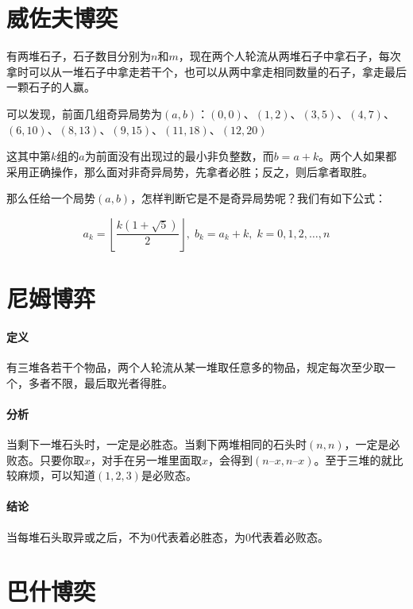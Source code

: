 \section{威佐夫博奕}

有两堆石子，石子数目分别为$n$和$m$，现在两个人轮流从两堆石子中拿石子，每次拿时可以从一堆石子中拿走若干个，也可以从两中拿走相同数量的石子，拿走最后一颗石子的人赢。

可以发现，前面几组奇异局势为$(a, b)$：$(0, 0)$、$(1, 2)$、$(3, 5)$、$(4, 7)$、$(6, 10)$、$(8, 13)$、$(9, 15)$、$(11, 18)$、$(12, 20)$

这其中第$k$组的$a为$前面没有出现过的最小非负整数，而$b=a+k$。两个人如果都采用正确操作，那么面对非奇异局势，先拿者必胜；反之，则后拿者取胜。

那么任给一个局势$(a, b)$，怎样判断它是不是奇异局势呢？我们有如下公式：

\begin{equation}
  a_k=\left\lfloor\frac{k(1+\sqrt{5})}{2}\right\rfloor, \; b_k=a_k+k, \; k=0,1,2, \dots , n
\end{equation}



\section{尼姆博弈}

\paragraph{定义} 有三堆各若干个物品，两个人轮流从某一堆取任意多的物品，规定每次至少取一个，多者不限，最后取光者得胜。

\paragraph{分析} 当剩下一堆石头时，一定是必胜态。当剩下两堆相同的石头时$(n, n)$，一定是必败态。只要你取$x$，对手在另一堆里面取$x$，会得到$(n – x, n – x)$。至于三堆的就比较麻烦，可以知道$(1, 2, 3)$是必败态。

\paragraph{结论} 当每堆石头取异或之后，不为0代表着必胜态，为0代表着必败态。



\section{巴什博奕}

